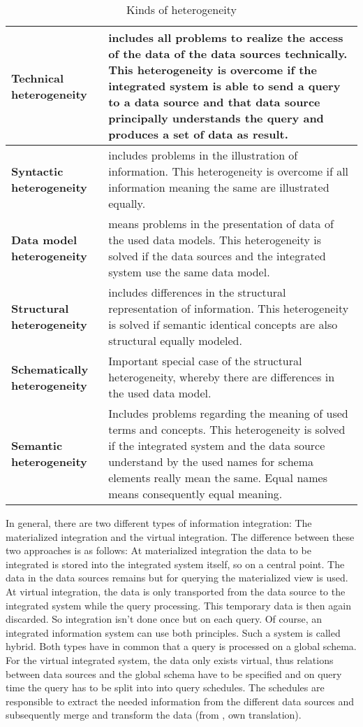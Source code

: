 \begin{table}[]
\centering
\caption{Kinds of heterogeneity}
\label{kinds-of-heterogeneity}
\begin{tabular}{|l|p{}|}
\hline
 \textbf{Technical  heterogeneity}  &  includes all problems to realize the access of the data of the data sources technically. This heterogeneity is overcome if the integrated system is able to send a query to a data source and that data source principally understands the query and produces a set of data as result.\\ \hline
 \textbf{Syntactic  heterogeneity}    &  includes problems in the illustration of information. This heterogeneity is overcome if all information meaning the same are illustrated equally.\\ \hline
 \textbf{Data model  heterogeneity} &  means problems in the presentation of data of the used data models. This heterogeneity is solved if the data sources and the integrated system use the same data model.\\ \hline
 \textbf{Structural  heterogeneity}    &  includes differences in the structural representation of information. This heterogeneity is solved if semantic identical concepts are also structural equally modeled. \\ \hline
 \textbf{Schematically  heterogeneity} &  Important special case of the structural heterogeneity, whereby there are differences in the used data model.\\ \hline
 \textbf{Semantic  heterogeneity}    &  Includes problems regarding the meaning of used terms and concepts. This heterogeneity is solved if the integrated system and the data source understand by the used names for schema elements really mean the same. Equal names means consequently equal meaning.\\ \hline
\end{tabular}
\end{table}

In general, there are two different types of information integration: The materialized integration and the virtual integration. The difference between these two approaches is as follows: At materialized integration the data to be integrated is stored  into the integrated system itself, so on a central point. The data in the data sources remains but for querying the materialized view is used. At virtual integration, the data is only transported from the data source to the integrated system while the query processing. This temporary data is then again discarded. So integration isn't done once but on each query. Of course, an integrated information system can use both principles. Such a system is called hybrid. Both types have in common that a query is processed on a global schema. For the virtual integrated system, the data only exists virtual, thus relations between data sources and the global schema have to be specified and on query time the query has to be split into into query schedules. The schedules are responsible to extract the needed information from the different data sources and subsequently merge and transform the data (from \cite[p. 86-88]{DBLP:books/dp/LeserN2006}, own translation).


